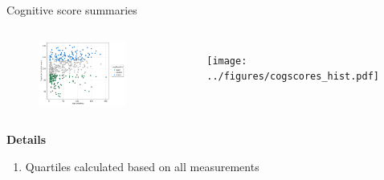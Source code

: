 
\begin{frame}{Cognitive score summaries}
    \begin{columns}[c] %

        
        \begin{figure}
            \includegraphics[width=1\linewidth]{../figures/cogScore_quartiles.png}
        \end{figure}

    
        \begin{figure}
        \texttt{[image: ../figures/cogscores\_hist.pdf]}
        \end{figure}

    \end{columns}

    \textbf{Details}
    \begin{enumerate}
        \item Quartiles calculated based on all measurements
    \end{enumerate}

\end{frame}

